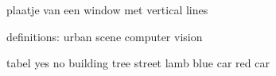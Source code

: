 
plaatje van een window met vertical lines


definitions:
urban scene
computer vision


tabel
							yes     no 
		building
		tree
		street lamb
		blue car
		red car


